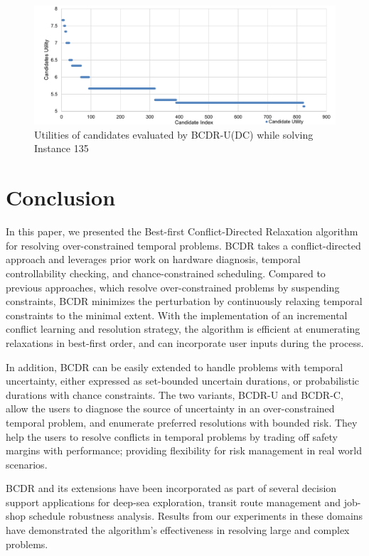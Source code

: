\documentclass[jair,twoside,11pt,theapa]{article}
\begin{document}


\begin{figure}[htb]
	\centering
	\includegraphics[width=1.0\textwidth]{figures/results/rcpsp_candidate_utility.pdf}
	\caption{Utilities of candidates evaluated by BCDR-U(DC) while solving Instance 135}
	\label{fig:rcpsp_candidate_utilities}
\end{figure}




\section{Conclusion}

In this paper, we presented the Best-first Conflict-Directed Relaxation
algorithm for resolving over-constrained temporal problems. BCDR takes a
conflict-directed approach and leverages prior work on hardware diagnosis,
temporal controllability checking, and chance-constrained scheduling. Compared to
previous approaches, which resolve over-constrained problems by suspending
constraints, BCDR minimizes the perturbation by continuously relaxing temporal
constraints to the minimal extent. With the implementation of an incremental
conflict learning and resolution strategy, the algorithm is efficient at
enumerating relaxations in best-first order, and can incorporate user inputs
during the process. 

In addition, BCDR can be easily extended to handle problems
with temporal uncertainty, either expressed as set-bounded uncertain durations,
or probabilistic durations with chance constraints. The two variants, BCDR-U and
BCDR-C, allow the users to diagnose the source of uncertainty in an
over-constrained temporal problem, and enumerate preferred resolutions with
bounded risk. They help the users to resolve conflicts in temporal problems by
trading off safety margins with performance; providing flexibility for
risk management in real world scenarios. 

BCDR and its extensions have been
incorporated as part of several decision support applications for deep-sea
exploration, transit route management and job-shop schedule robustness analysis.
Results from our experiments in these domains have demonstrated the algorithm's
effectiveness in resolving large and complex problems.




\end{document}
